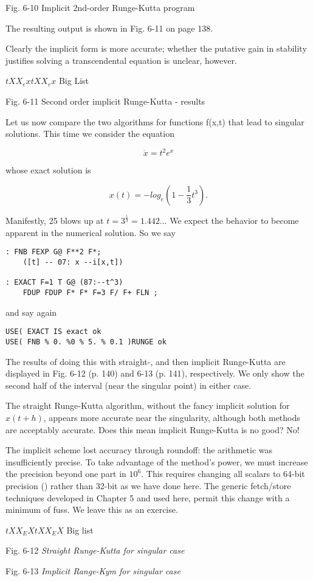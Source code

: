 Fig. 6-10 Implicit 2nd-order Runge-Kutta program

The resulting output is shown in Fig. 6-11 on page 138.

Clearly the implicit form is more accurate; whether the putative gain in stability justifies solving a transcendental equation is unclear, however.

$t X X_ex t X X_ex$
Big List

Fig. 6-11 Second order implicit Runge-Kutta - results

Let us now compare the two algorithms for functions f(x,t) that lead to singular solutions. This time we consider the equation

\begin{equation}
\dot{x} = t^2e^x
\end{equation}

whose exact solution is

\begin{equation}
x(t) = -log_e(1-\frac{1}{3}t^3).
\end{equation}

Manifestly, 25 blows up at $t = 3^\frac{1}{3}=1.442...$ We expect the behavior to become apparent in the numerical solution. So we say

\begin{lstlisting}
: FNB FEXP G@ F**2 F*;
    ([t] -- 07: x --i[x,t])

: EXACT F=1 T G@ (87:--t^3)
    FDUP FDUP F* F* F=3 F/ F+ FLN ;
\end{lstlisting}

and say again
\begin{lstlisting}
USE( EXACT IS exact ok
USE( FNB % 0. %0 % 5. % 0.1 )RUNGE ok
\end{lstlisting}

The results of doing this with straight-, and then implicit Runge-Kutta are displayed in Fig. 6-12 (p. 140) and 6-13 (p. 141), respectively. We only show the second half of the interval (near the singular point) in either case.

The straight Runge-Kutta algorithm, without the fancy implicit solution for $x(t +h)$, appears more accurate near the singularity, although both methods are acceptably accurate. Does this mean implicit Runge-Kutta is no good? No!

The implicit scheme lost accuracy through roundoff: the arithmetic was insufficiently precise. To take advantage of the method's power, we must increase the precision beyond one part in $10^{6}$. This requires changing all scalars to 64-bit precision () rather than 32-bit as we have done here. The generic fetch/store techniques developed in Chapter 5 and used here, permit this change with a minimum of fuss. We leave this as an exercise.

$t X X_EX t X X_EX$
Big list

Fig. 6-12 \textit{Straight Runge-Kutta for singular case}

Fig. 6-13 \textit{Implicit Range-Kym for singular case}
